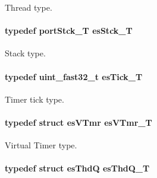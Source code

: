 Thread type. 

\hypertarget{group__kern__intf_ga24160ddd0cb0327108cc652bfe6a49e5}{
\paragraph[{es\-Stck\-\_\-\-T}]{\setlength{\rightskip}{0pt plus 5cm}typedef {\bf port\-Stck\-\_\-\-T} {\bf es\-Stck\-\_\-\-T}}}\label{group__kern__intf_ga24160ddd0cb0327108cc652bfe6a49e5}


Stack type. 

\hypertarget{group__kern__intf_ga844873888c186ee81eb66620dadb0451}{
\paragraph[{es\-Tick\-\_\-\-T}]{\setlength{\rightskip}{0pt plus 5cm}typedef uint\-\_\-fast32\-\_\-t {\bf es\-Tick\-\_\-\-T}}}\label{group__kern__intf_ga844873888c186ee81eb66620dadb0451}


Timer tick type. 

\hypertarget{group__kern__intf_ga3c020f0ca54ff412bc1d1505502d2afc}{
\paragraph[{es\-V\-Tmr\-\_\-\-T}]{\setlength{\rightskip}{0pt plus 5cm}typedef struct {\bf es\-V\-Tmr} {\bf es\-V\-Tmr\-\_\-\-T}}}\label{group__kern__intf_ga3c020f0ca54ff412bc1d1505502d2afc}


Virtual Timer type. 

\hypertarget{group__kern__intf_ga7a1a060699e83a01512ebb5540019556}{
\paragraph[{es\-Thd\-Q\-\_\-\-T}]{\setlength{\rightskip}{0pt plus 5cm}typedef struct {\bf es\-Thd\-Q} {\bf es\-Thd\-Q\-\_\-\-T}}}\label{group__kern__intf_ga7a1a060699e83a01512ebb5540019556}


